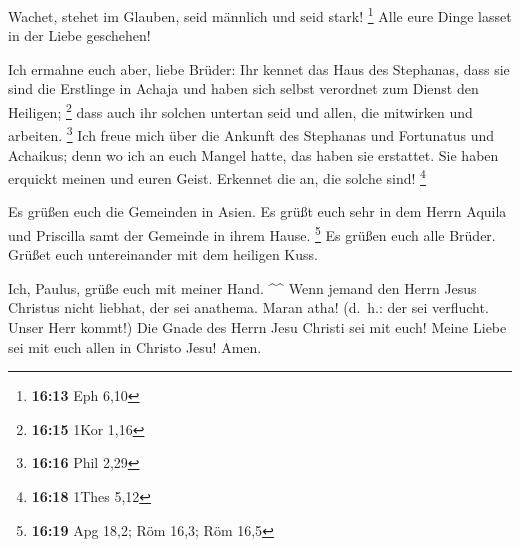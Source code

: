 Wachet, stehet im Glauben, seid männlich und seid stark!
\footnote{\textbf{16:13} Eph 6,10}  Alle eure Dinge lasset
in der Liebe geschehen!

 Ich ermahne euch aber, liebe Brüder: Ihr kennet das Haus
des Stephanas, dass sie sind die Erstlinge in Achaja und haben sich
selbst verordnet zum Dienst den Heiligen; \footnote{\textbf{16:15} 1Kor
  1,16}  dass auch ihr solchen untertan seid und allen, die
mitwirken und arbeiten. \footnote{\textbf{16:16} Phil 2,29}
 Ich freue mich über die Ankunft des Stephanas und
Fortunatus und Achaikus; denn wo ich an euch Mangel hatte, das haben sie
erstattet.  Sie haben erquickt meinen und euren Geist.
Erkennet die an, die solche sind! \footnote{\textbf{16:18} 1Thes 5,12}

 Es grüßen euch die Gemeinden in Asien. Es grüßt euch sehr
in dem Herrn Aquila und Priscilla samt der Gemeinde in ihrem Hause.
\footnote{\textbf{16:19} Apg 18,2; Röm 16,3; Röm 16,5}  Es
grüßen euch alle Brüder. Grüßet euch untereinander mit dem heiligen
Kuss.

 Ich, Paulus, grüße euch mit meiner Hand. \^{}\^{}
 Wenn jemand den Herrn Jesus Christus nicht liebhat, der
sei anathema. Maran atha! (d.~h.: der sei verflucht. Unser Herr kommt!)
 Die Gnade des Herrn Jesu Christi sei mit euch!
 Meine Liebe sei mit euch allen in Christo Jesu! Amen.
